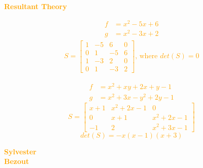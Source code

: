 \documentclass{beamer}
\begin{document}
\begin{frame}
\centering
\Huge \textcolor{orange}{\textbf{Resultant Theory}}
\end{frame}

\begin{frame}
    \centering
    
    \end{frame}

\begin{frame}
    {\Large
    \textcolor{orange}{
    \boldmath
    \begin{align*}
    f & = x ^ 2 - 5  x + 6 \\
    g & = x ^ 2 - 3  x + 2
    \end{align*}}
    \pause
    \textcolor{orange}{
    \boldmath
    \begin{align*}
    S = \left[\begin{matrix}1 & -5 & 6 & 0\\0 & 1 & -5 & 6\\1 & -3 & 2 & 0\\0 & 1 & -3 & 2\end{matrix}\right]\text{, where }
    det(S) = 0
    \end{align*}}}

\end{frame}

\begin{frame}
    {\Large
    \textcolor{orange}{
    \boldmath
    \begin{align*}
    f & = x ^ 2 + x  y + 2 x + y -1 \\
    g & = x ^ 2 + 3  x - y ^ 2 + 2  y - 1
    \end{align*}}
    \pause
    \textcolor{orange}{
     \boldmath\[S = \left[\begin{matrix}x + 1 & x^{2} + 2 x - 1 & 0\\0 & x + 1 & x^{2} + 2 x - 1\\-1 & 2 & x^{2} + 3 x - 1\end{matrix}\right]\]
    \pause
    \vspace{1cm}
     \boldmath\[det(S) = - x \left(x - 1\right) \left(x + 3\right)\]}}
\end{frame}

\begin{frame}
    \begin{center}
    \textcolor{orange}{\textbf{\Huge{
        Sylvester \\ \vspace{1cm}
        Bezout}}}
    \end{center}
\end{frame}
\end{document}
